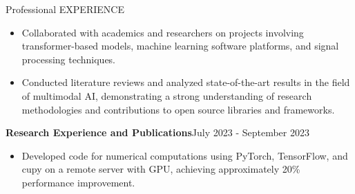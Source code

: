 \documentclass{resume}
\begin{document}
\begin{rSection}{Professional EXPERIENCE}
\begin{itemize}
\item Collaborated with academics and researchers on projects involving transformer-based models, machine learning software platforms, and signal processing techniques.

\item Conducted literature reviews and analyzed state-of-the-art results in the field of multimodal AI, demonstrating a strong understanding of research methodologies and contributions to open source libraries and frameworks.
\end{itemize}

    
\textbf{Research Experience and Publications}\hfill July 2023 - September 2023

\vspace{-5pt}

    
\begin{itemize}

    \item Developed code for numerical computations using PyTorch, TensorFlow, and cupy on a remote server with GPU, achieving approximately 20\% performance improvement.

\end{itemize}





\end{rSection} 
\vspace{-15pt}
\end{document}
